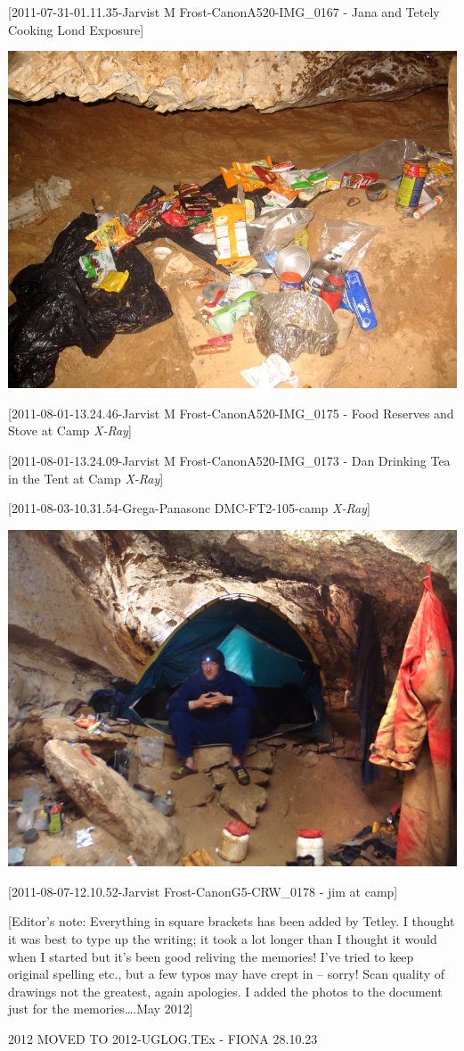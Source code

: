 {[}2011-07-31-01.11.35-Jarvist M Frost-CanonA520-IMG\_0167 - Jana and
Tetely Cooking Lond Exposure{]}

\includegraphics{2011/ug_logbook/59.png}

{[}2011-08-01-13.24.46-Jarvist M Frost-CanonA520-IMG\_0175 - Food
Reserves and Stove at Camp \emph{X-Ray}{]}

{[}2011-08-01-13.24.09-Jarvist M Frost-CanonA520-IMG\_0173 - Dan
Drinking Tea in the Tent at Camp \emph{X-Ray}{]}

{[}2011-08-03-10.31.54-Grega-Panasonc DMC-FT2-105-camp \emph{X-Ray}{]}

\includegraphics{2011/ug_logbook/62.png}

{[}2011-08-07-12.10.52-Jarvist Frost-CanonG5-CRW\_0178 - jim at camp{]}

{[}Editor's note: Everything in square brackets has been added by
Tetley. I thought it was best to type up the writing; it took a lot
longer than I thought it would when I started but it's been good
reliving the memories! I've tried to keep original spelling etc., but a
few typos may have crept in -- sorry! Scan quality of drawings not the
greatest, again apologies. I added the photos to the document just for
the memories\ldots{}.May 2012{]}





2012 MOVED TO 2012-UGLOG.TEx - FIONA 28.10.23